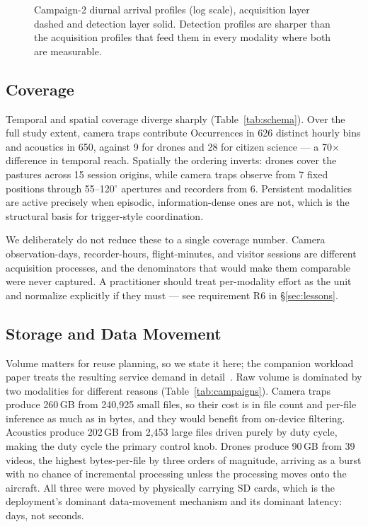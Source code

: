 \documentclass[sigconf]{acmart}
\begin{document}
\begin{figure}[t]
    \centering
    \caption{Campaign-2 diurnal arrival profiles (log scale),
    acquisition layer dashed and detection layer solid. Detection
    profiles are sharper than the acquisition profiles that feed them in
    every modality where both are measurable.}
    \label{fig:diurnal}
\end{figure}

\subsection{Coverage}

Temporal and spatial coverage diverge sharply (Table~\ref{tab:schema}).
Over the full study extent, camera traps contribute Occurrences in
626 distinct hourly bins and acoustics in 650, against 9 for drones and
28 for citizen science --- a 70$\times$ difference in temporal reach.
Spatially the ordering inverts: drones cover the pastures across
15 session origins, while camera traps observe from 7 fixed positions
through 55--120$^\circ$ apertures and recorders from 6. Persistent
modalities are active precisely when episodic, information-dense ones
are not, which is the structural basis for trigger-style coordination.

We deliberately do not reduce these to a single coverage number. Camera
observation-days, recorder-hours, flight-minutes, and visitor sessions
are different acquisition processes, and the denominators that would
make them comparable were never captured. A practitioner should treat
per-modality effort as the unit and normalize explicitly if they must
--- see requirement R6 in \S\ref{sec:lessons}.

\subsection{Storage and Data Movement}

Volume matters for reuse planning, so we state it here; the companion
workload paper treats the resulting service demand in
detail~\cite{smartwilds_workload}. Raw volume is dominated by two
modalities for different reasons (Table~\ref{tab:campaigns}). Camera
traps produce 260\,GB from 240{,}925 small files, so their cost is in
file count and per-file inference as much as in bytes, and they would
benefit from on-device filtering. Acoustics produce 202\,GB from
2{,}453 large files driven purely by duty cycle, making the duty cycle
the primary control knob. Drones produce 90\,GB from 39 videos, the
highest bytes-per-file by three orders of magnitude, arriving as a burst
with no chance of incremental processing unless the processing moves onto
the aircraft. All three were moved by physically carrying SD cards,
which is the deployment's dominant data-movement mechanism and its
dominant latency: days, not seconds.
\end{document}
